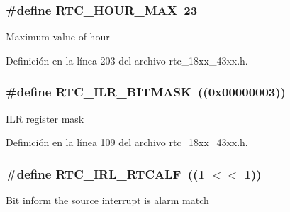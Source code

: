 \subsubsection[{\texorpdfstring{R\+T\+C\+\_\+\+H\+O\+U\+R\+\_\+\+M\+AX}{RTC_HOUR_MAX}}]{\setlength{\rightskip}{0pt plus 5cm}\#define R\+T\+C\+\_\+\+H\+O\+U\+R\+\_\+\+M\+AX~23}\hypertarget{group___r_t_c__18_x_x__43_x_x_ga35630c42240ce2e8f74c38e1731d7e68}{}\label{group___r_t_c__18_x_x__43_x_x_ga35630c42240ce2e8f74c38e1731d7e68}
Maximum value of hour 

Definición en la línea 203 del archivo rtc\+\_\+18xx\+\_\+43xx.\+h.

\subsubsection[{\texorpdfstring{R\+T\+C\+\_\+\+I\+L\+R\+\_\+\+B\+I\+T\+M\+A\+SK}{RTC_ILR_BITMASK}}]{\setlength{\rightskip}{0pt plus 5cm}\#define R\+T\+C\+\_\+\+I\+L\+R\+\_\+\+B\+I\+T\+M\+A\+SK~((0x00000003))}\hypertarget{group___r_t_c__18_x_x__43_x_x_ga9c00baff0fca4f8e747fadfe9ee12775}{}\label{group___r_t_c__18_x_x__43_x_x_ga9c00baff0fca4f8e747fadfe9ee12775}
I\+LR register mask 

Definición en la línea 109 del archivo rtc\+\_\+18xx\+\_\+43xx.\+h.

\subsubsection[{\texorpdfstring{R\+T\+C\+\_\+\+I\+R\+L\+\_\+\+R\+T\+C\+A\+LF}{RTC_IRL_RTCALF}}]{\setlength{\rightskip}{0pt plus 5cm}\#define R\+T\+C\+\_\+\+I\+R\+L\+\_\+\+R\+T\+C\+A\+LF~((1 $<$$<$ 1))}\hypertarget{group___r_t_c__18_x_x__43_x_x_ga237351d2c7f08b447254eff9578eb11e}{}\label{group___r_t_c__18_x_x__43_x_x_ga237351d2c7f08b447254eff9578eb11e}
Bit inform the source interrupt is alarm match 

